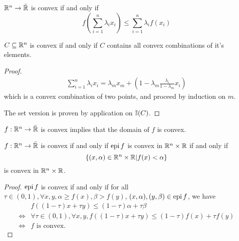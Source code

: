 \begin{thm}
  \label{defn:convexity:3}
  $\mathbb{R}^{n} \rightarrow \bar {\mathbb{R}}$ is convex if and only if
  \begin{equation}
    \label{eq:13}
    f \left(\sum_{i=1}^{n} \lambda_{i} x_{i} \right) \leq \sum_{i=1}^{n}
    \lambda_{i} f(x_{i})
  \end{equation}

  $C \subseteq \mathbb{R}^{n}$ is convex if and only if $C$ contains all
  convex combinations of it's elements.
\end{thm}
\begin{proof}
  \begin{align}
    \sum_{i=1}^{n} \lambda_{i} x_{i} = \lambda_{m} x_{m} + \left(
      1-\lambda_{m} \frac{\lambda_{i}}{1 - \lambda_{m}} x_{i} \right)
  \end{align} which is a convex combination of two points, and proceed
  by induction on $m$.

  The set version is proven by application on $\I{C}$.
\end{proof}

\begin{proposition}
  $f: \mathbb{R}^{n} \rightarrow \bar {\mathbb{R}}$ is convex implies that the domain of
  $f$ is convex.
\end{proposition}


\begin{proposition}
  $f: \mathbb{R}^{n} \rightarrow \bar {\mathbb{R}}$ is convex if and only if $\operatorname*{epi} f$ is
  convex in $\mathbb{R}^{n} \times \mathbb{R}$ if and only if
  \begin{equation}
    \label{eq:14}
    \{ (x, \alpha) \in \mathbb{R}^{n} \times \mathbb{R} | f(x) < \alpha \}
  \end{equation} is convex in $\mathbb{R}^{n} \times \mathbb{R}$.
\end{proposition}

\begin{proof}
  $\operatorname*{epi} f$ is convex if and only if for all $\tau \in (0, 1), \forall
  x, y, \alpha \geq f(x), \beta > f(y)$, $(x, \alpha), (y, \beta) \in
  \operatorname*{epi} f$, we have
  \begin{align}
    \label{eq:127}
     &f((1-\tau)x + \tau y) \leq (1-\tau)\alpha + \tau
     \beta \\
     \iff &\forall \tau \in (0,1), \forall x, y, f((1-\tau)x + \tau
     y) \leq (1-\tau) f(x) + \tau f(y) \\
     \iff &\text{$f$ is convex}.
  \end{align}
\end{proof}

